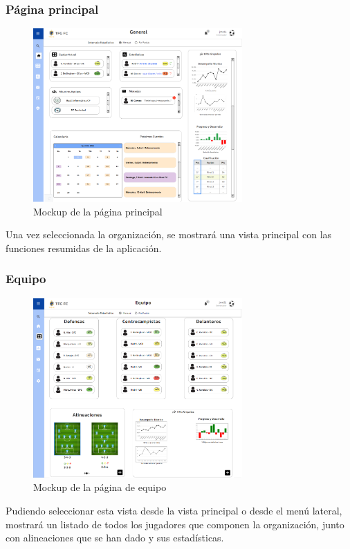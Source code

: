 \subsubsection{Página principal}
\begin{figure}[H] 
    \centering
    \includegraphics[width=8cm]{archivos/tfg_jorge/mockups/home}
    \caption{Mockup de la página principal}\label{sistemass2}
\end{figure}
Una vez seleccionada la organización, se mostrará una vista principal con las funciones resumidas de la aplicación.
\subsubsection{Equipo}
\begin{figure}[H] 
    \centering
    \includegraphics[width=8cm]{archivos/tfg_jorge/mockups/equipo}
    \caption{Mockup de la página de equipo}\label{sistemass2}
\end{figure}
Pudiendo seleccionar esta vista desde la vista principal o desde el menú lateral, mostrará un listado de todos los jugadores que componen la organización, junto con alineaciones que se han dado y sus estadísticas.
